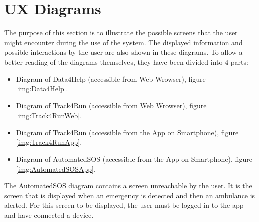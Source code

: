 \section{UX Diagrams}
The purpose of this section is to illustrate the possible screens that the user might encounter during the use of the system.
The displayed information and possible interactions by the user are also shown in these diagrams.
To allow a better reading of the diagrams themselves, they have been divided into 4 parts:
\begin{itemize}
  \item Diagram of Data4Help (accessible from Web Wrowser), figure \ref{img:Data4Help}.
  \item Diagram of Track4Run (accessible from Web Wrowser), figure \ref{img:Track4RunWeb}.
  \item Diagram of Track4Run (accessible from the App on Smartphone), figure \ref{img:Track4RunApp}.
  \item Diagram of AutomatedSOS (accessible from the App on Smartphone), figure \ref{img:AutomatedSOSApp}.
\end{itemize}
The AutomatedSOS diagram contains a screen unreachable by the user. It is the screen that is displayed when an emergency is detected and then an ambulance is alerted. For this screen to be displayed, the user must be logged in to the app and have connected a device.

